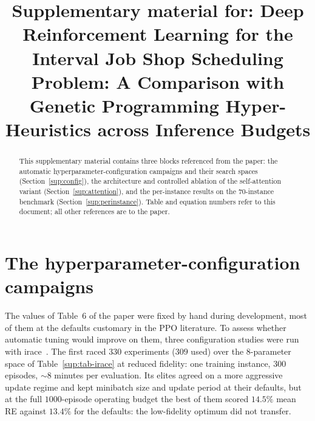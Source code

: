 \documentclass[preprint,authoryear,12pt]{elsarticle}
\begin{document}
\begin{frontmatter}

\title{Supplementary material for: Deep Reinforcement Learning for
the Interval Job Shop Scheduling Problem: A Comparison with Genetic
Programming Hyper-Heuristics across Inference Budgets}

\begin{abstract}
This supplementary material contains three blocks
referenced from the paper: the automatic
hyperparameter-configuration campaigns and their search spaces
(Section~\ref{sup:config}), the architecture and controlled ablation
of the self-attention variant (Section~\ref{sup:attention}), and the
per-instance results on the 70-instance benchmark
(Section~\ref{sup:perinstance}). Table and equation numbers refer to
this document; all other references are to the paper.
\end{abstract}

\end{frontmatter}

\section{The hyperparameter-configuration campaigns}
\label{sup:config}

The values of Table~6 of the paper were fixed by hand during
development, most of them at the defaults customary in the PPO
literature. To assess whether automatic tuning would improve on them,
three configuration studies were run with
irace~\citep{LopezIbanez2016}. The first raced $330$ experiments
($309$ used) over the 8-parameter space of Table~\ref{sup:tab-irace}
at reduced fidelity: one training instance, $300$ episodes,
${\sim}8$ minutes per evaluation. Its elites agreed on a more
aggressive update regime and kept minibatch size and update period at
their defaults, but at the full $1000$-episode operating budget the
best of them scored $14.5\%$ mean RE against $13.4\%$ for the
defaults: the low-fidelity optimum did not transfer.
\end{document}
